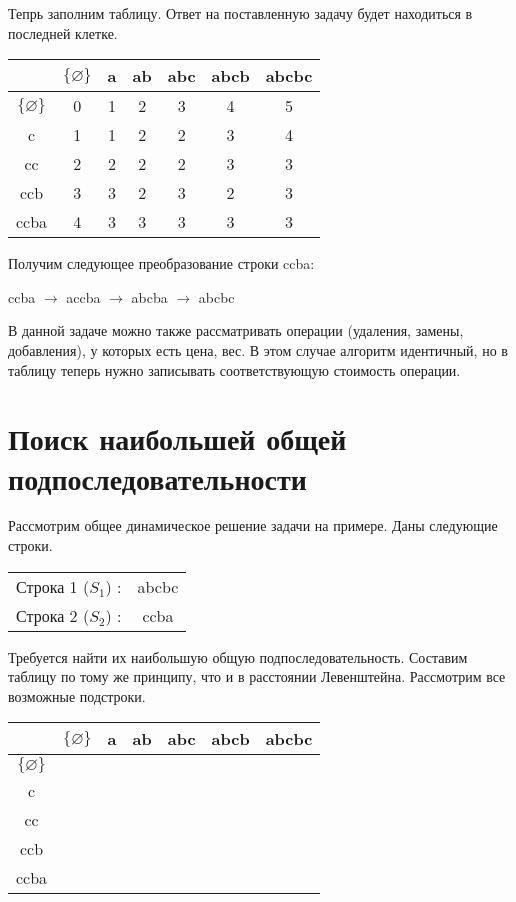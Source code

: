 \documentclass[a4paper,12pt] {report} 			%
\begin{document}
Тепрь заполним таблицу. Ответ на поставленную задачу будет 
находиться в последней клетке.

\begin{center}
	\begin{tabular}{ | c | c c c c c c | }
		\hline
		& $\{ \varnothing \}$ & a & ab & abc & abcb & abcbc \\
		\hline
		$\{ \varnothing \}$ & 0 & 1 & 2 & 3 & 4 & 5 \\
		c & 1 & 1 & 2 & 2 & 3 & 4 \\
		cc & 2 & 2 & 2 & 2 & 3 & 3 \\
		ccb & 3 & 3 & 2 & 3 & 2 & 3 \\
		ccba & 4 & 3 & 3 & 3 & 3 & 3\\
		\hline
	\end{tabular}
\end{center}

Получим следующее преобразование строки ccba:

\begin{center}
	ccba $\rightarrow$ accba $\rightarrow$ abcba $\rightarrow$ abcbc
\end{center}

В данной задаче можно также рассматривать операции (удаления, замены, добавления), у которых есть цена, вес. 
В этом случае алгоритм идентичный, но в таблицу теперь нужно записывать соответствующую стоимость операции.

\section{Поиск наибольшей общей подпоследовательности}

Рассмотрим общее динамическое решение задачи на примере. Даны следующие строки.

\begin{center}
	\begin{tabular}{ c c }
		Строка 1 ($S_{1}$) : & abcbc \\
		Строка 2 ($S_{2}$) : & ccba \\
	\end{tabular}
\end{center}

Требуется найти их наибольшую общую подпоследовательность. Составим таблицу по тому же 
принципу, что и в расстоянии Левенштейна. Рассмотрим все возможные подстроки.

\begin{center}
	\begin{tabular}{ | c | c c c c c c | }
		\hline
		& $\{ \varnothing \}$ & a & ab & abc & abcb & abcbc \\
		\hline
		$\{ \varnothing \}$ & & & & & & \\
		c & & & & & & \\
		cc & & & & & & \\
		ccb & & & & & & \\
		ccba & & & & & & \\
		\hline
	\end{tabular}
\end{center}
\end{document}
